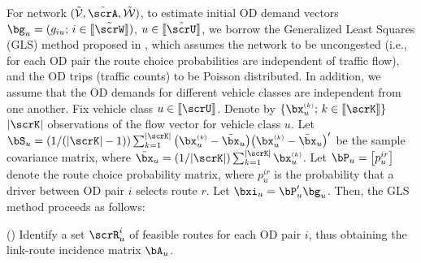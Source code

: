 \documentclass[3p]{elsarticle}
\newcommand{\rmnum}[1]{\romannumeral #1}
\begin{document}
\begin{itemize}
	For network $( {\tilde{\mathcal{V}}, \tilde{\scrA}, \tilde{\mathcal{W}}} )$, to estimate initial OD demand vectors $\bg_u = ( {{g_{iu}}; \,i \in [\kern-0.15em[ \tilde \scrW 
		]\kern-0.15em]} )$, $u \in [\kern-0.15em[ \tilde \scrU 
	]\kern-0.15em]$, we borrow the Generalized Least Squares (GLS) method proposed in \cite{hazelton2000estimation}, which assumes the network to be uncongested (i.e., for each OD pair the route choice probabilities are independent of traffic flow), and the OD trips (traffic counts) to be Poisson distributed. In addition, we assume that the OD demands for different vehicle classes are independent from one another. Fix vehicle class $u \in [\kern-0.15em[ \scrU 
	]\kern-0.15em]$.
	Denote by $\{ {{\bx_u^{\scriptscriptstyle{(k)}}}};
	\, k \in [\kern-0.15em[ \scrK 
	]\kern-0.15em]\}$ $|\scrK|$ observations of the flow vector for vehicle class $u$. Let $\bS_u = (1/(|\scrK| - 1))\sum\nolimits_{k = 1}^{|\scrK|} {\big(
		{{\bx_u^{\scriptscriptstyle{(k)}}} - \bar {\bx}_u} \big){{\big(
				{{\bx_u^{\scriptscriptstyle{(k)}}} - \bar {\bx}_u} \big)}' }}$ be
	the sample covariance matrix, where $\bar \bx_u  = (1/|\scrK|)\sum\nolimits_{k = 1}^{|\scrK|} {{\bx_u^{\scriptscriptstyle{(k)}}}} $. Let $\bP_u = \left[ {{p_u^{ir}}} \right]$ denote the
	route choice probability matrix, where $p_u^{ir}$ is the probability that a driver between OD pair $i$
	selects route $r$. Let $\bxi_u  = \bP_u'\bg_u$. Then, the GLS method proceeds as follows:
	
	(\rmnum{1}) Identify a set $\scrR_u^i$ of feasible routes for each OD pair $i$, thus obtaining the link-route incidence matrix $\bA_u$. 
	

\end{itemize}
\end{document}
